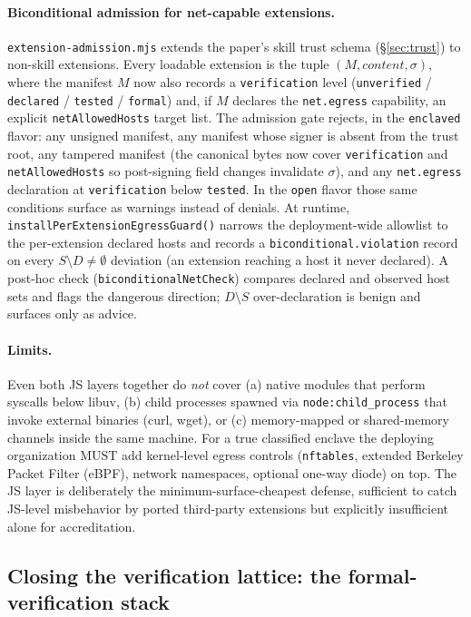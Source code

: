 \documentclass[11pt]{article}
\begin{document}
\paragraph{Biconditional admission for net-capable extensions.}
\texttt{extension-admission.mjs} extends the paper's skill trust schema
(§\ref{sec:trust}) to non-skill extensions. Every loadable extension is
the tuple $(M, \mathit{content}, \sigma)$, where the manifest $M$ now
also records a \texttt{verification} level
(\texttt{unverified} / \texttt{declared} / \texttt{tested} /
\texttt{formal}) and, if $M$ declares the \texttt{net.egress} capability,
an explicit \texttt{netAllowedHosts} target list. The admission gate
rejects, in the \texttt{enclaved} flavor: any unsigned manifest, any
manifest whose signer is absent from the trust root, any tampered
manifest (the canonical bytes now cover \texttt{verification} and
\texttt{netAllowedHosts} so post-signing field changes invalidate
$\sigma$), and any \texttt{net.egress} declaration at
\texttt{verification} below \texttt{tested}. In the \texttt{open}
flavor those same conditions surface as warnings instead of denials.
At runtime, \texttt{installPerExtensionEgressGuard()} narrows the
deployment-wide allowlist to the per-extension declared hosts and
records a \texttt{biconditional.violation} record on every
$S \setminus D \neq \emptyset$ deviation (an extension reaching a
host it never declared). A post-hoc check
(\texttt{biconditionalNetCheck}) compares declared and observed host
sets and flags the dangerous direction;
$D \setminus S$ over-declaration is benign and surfaces only as advice.

\paragraph{Limits.} Even both JS layers together do \emph{not} cover
(a) native modules that perform syscalls below libuv, (b) child
processes spawned via \texttt{node:child\_process} that invoke external
binaries (curl, wget), or (c) memory-mapped or shared-memory channels
inside the same machine. For a true classified enclave the deploying
organization MUST add kernel-level egress controls (\texttt{nftables},
extended Berkeley Packet Filter (eBPF), network namespaces, optional
one-way diode) on top. The JS layer is deliberately the
minimum-surface-cheapest defense, sufficient to catch JS-level
misbehavior by ported third-party extensions but explicitly insufficient
alone for accreditation.

\subsection{Closing the verification lattice: the formal-verification stack}
\label{sec:formal-stack}
\end{document}
